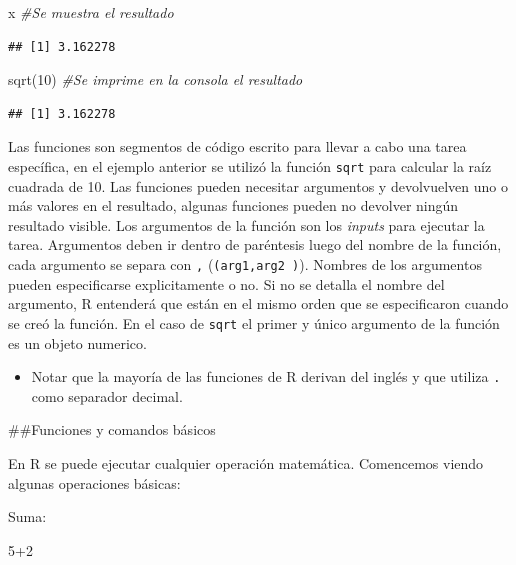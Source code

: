 \documentclass[
]{book}
\newenvironment{Shaded}{\begin{snugshade}}{\end{snugshade}}
\newcommand{\CommentTok}[1]{\textcolor[rgb]{0.56,0.35,0.01}{\textit{#1}}}
\newcommand{\DecValTok}[1]{\textcolor[rgb]{0.00,0.00,0.81}{#1}}
\newcommand{\FunctionTok}[1]{\textcolor[rgb]{0.00,0.00,0.00}{#1}}
\newcommand{\NormalTok}[1]{#1}
\newcommand{\SpecialCharTok}[1]{\textcolor[rgb]{0.00,0.00,0.00}{#1}}
\newenvironment{rmdblock}[1]
{\begin{shaded*}
		\begin{itemize}
			\renewcommand{\labelitemi}{
				\raisebox{-.7\height}[0pt][0pt]{
					{\setkeys{Gin}{width=3em,keepaspectratio}\texttt{[image: images/\#1]}}
				}
			}
			\item
		}
		{
		\end{itemize}
	\end{shaded*}
}
\newenvironment{rmdnote}
{\begin{rmdblock}{note}}
	{\end{rmdblock}}
\begin{document}
\begin{Shaded}
\begin{Highlighting}[]
\NormalTok{x }\CommentTok{\#Se muestra el resultado}
\end{Highlighting}
\end{Shaded}

\begin{verbatim}
## [1] 3.162278
\end{verbatim}

\begin{Shaded}
\begin{Highlighting}[]
\FunctionTok{sqrt}\NormalTok{(}\DecValTok{10}\NormalTok{) }\CommentTok{\#Se imprime en la consola el resultado}
\end{Highlighting}
\end{Shaded}

\begin{verbatim}
## [1] 3.162278
\end{verbatim}

Las funciones son segmentos de código escrito para llevar a cabo una tarea específica, en el ejemplo anterior se utilizó la función \texttt{sqrt} para calcular la raíz cuadrada de 10. Las funciones pueden necesitar argumentos y devolvuelven uno o más valores en el resultado, algunas funciones pueden no devolver ningún resultado visible. Los argumentos de la función son los \emph{inputs} para ejecutar la tarea. Argumentos deben ir dentro de paréntesis luego del nombre de la función, cada argumento se separa con \texttt{,} (\texttt{(arg1,arg2\ )}). Nombres de los argumentos pueden especificarse explicitamente o no. Si no se detalla el nombre del argumento, R entenderá que están en el mismo orden que se especificaron cuando se creó la función. En el caso de \texttt{sqrt} el primer y único argumento de la función es un objeto numerico.

\begin{rmdnote}
Notar que la mayoría de las funciones de R derivan del inglés y que
utiliza \texttt{.} como separador decimal.
\end{rmdnote}

\#\#Funciones y comandos básicos

En R se puede ejecutar cualquier operación matemática. Comencemos viendo algunas operaciones básicas:

Suma:

\begin{Shaded}
\begin{Highlighting}[]
\DecValTok{5}\SpecialCharTok{+}\DecValTok{2}
\end{Highlighting}
\end{Shaded}
\end{document}
